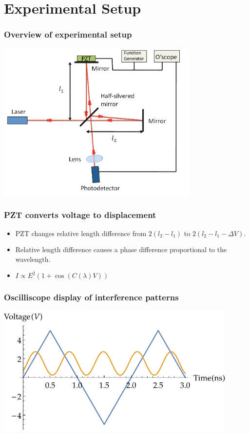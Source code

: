 \documentclass{beamer}
\begin{document}
\section{Experimental Setup}
\begin{frame}
  \frametitle{Overview of experimental setup}
  \hspace{25pt}\includegraphics[width=10cm]{setup.png}
\end{frame}

\begin{frame}
  \frametitle{PZT converts voltage to displacement}
  \begin{itemize}
    \item PZT changes relative length difference from $2(l_2 - l_1)$ to $2(l_2 - l_1 - \Delta V)$.
    \item Relative length difference causes a phase difference proportional to the wavelength.
    \item $I \propto E^2 (1 + \cos(C(\lambda)V) )$
  \end{itemize}
\end{frame}

\begin{frame}
  \frametitle{Oscilliscope display of interference patterns}
  \includegraphics[width=12cm]{waveform}
\end{frame}
\end{document}
